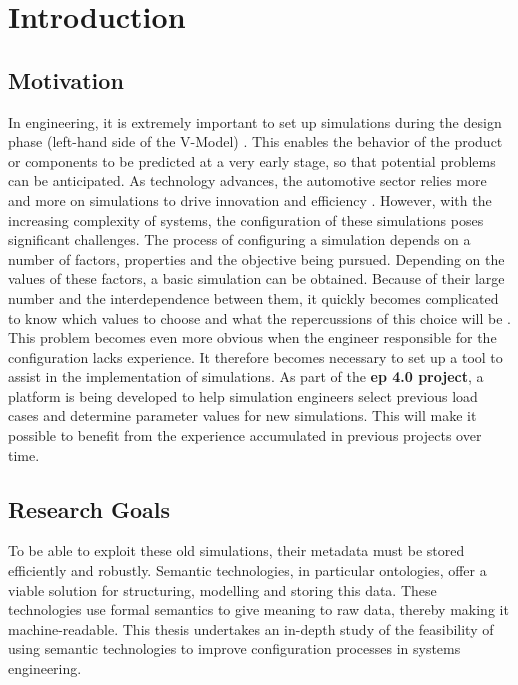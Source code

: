 \section{Introduction\label{sec:introduction}}


\subsection{Motivation}
In engineering, it is extremely important to set up simulations during the design phase (left-hand side of the V-Model) \cite{hammami2015thefose}. This enables the behavior of the product or components to be predicted at a very early stage, so that potential problems can be anticipated.  As technology advances, the automotive sector relies more and more on simulations to drive innovation and efficiency \cite{hammami2015thefose}. However, with the increasing complexity of systems, the configuration of these simulations poses significant challenges. The process of configuring a simulation depends on a number of factors, properties and the objective being pursued. Depending on the values of these factors, a basic simulation can be obtained. Because of their large number and the interdependence between them, it quickly becomes complicated to know which values to choose and what the repercussions of this choice will be \cite{hammami2015thefose, horsch2021osmo, spelten2023simulation}. This problem becomes even more obvious when the engineer responsible for the configuration lacks experience. It therefore becomes necessary to set up a tool to assist in the implementation of simulations. As part of the \textbf{\acrfull{ep} 4.0 project}, a platform is being developed to help simulation engineers select previous load cases and determine parameter values for new simulations. This will make it possible to benefit from the experience accumulated in previous projects over time.


\subsection{Research Goals}
To be able to exploit these old simulations, their metadata must be stored efficiently and robustly. Semantic technologies, in particular ontologies, offer a viable solution for structuring, modelling and storing this data. These technologies use formal semantics to give meaning to raw data, thereby making it machine-readable. This thesis undertakes an in-depth study of the feasibility of using semantic technologies to improve configuration processes in systems engineering.\\

